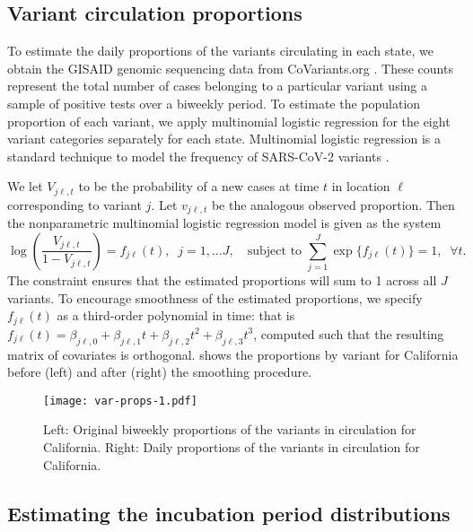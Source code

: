\subsection{Variant circulation proportions}
\label{sec:variant-proportions}


To estimate the daily proportions of the variants circulating in each state, we
obtain the GISAID genomic sequencing data from CoVariants.org
\citep{hodcroft2021covariants, elbe2017data}. These counts represent the total
number of cases belonging to a particular variant using
a sample of positive tests over a biweekly period. To estimate the population
proportion of each variant, we apply multinomial logistic regression 
for the eight variant categories separately for each state. 
Multinomial logistic regression is a standard technique to model the
frequency of SARS-CoV-2 variants 
\citep{obermeyer2022analysis, annavajhala2021emergence, figgins2021sars}.

We let $V_{j\ell,t}$ to be the probability of a new cases at time $t$ in location
$\ell$ corresponding to variant $j$. Let $v_{j\ell,t}$ be the analogous observed
proportion. Then the nonparametric multinomial logistic regression model is given
as the system
\begin{equation}
\log\left(\frac{V_{j\ell,t}}{1-V_{j\ell,t}}\right) = f_{j\ell}(t),\;\; j=1,\ldots J,\quad
\textrm{subject to }\sum_{j=1}^J \exp\{f_{j\ell}(t)\} = 1, \;\;\forall t.
\end{equation}
The constraint ensures that the estimated proportions will sum to 1 across all
$J$ variants. To encourage smoothness of the estimated proportions, we specify
$f_{j\ell}(t)$ as a third-order polynomial in time: that is $f_{j\ell}(t) =
\beta_{j\ell,0} + \beta_{j\ell,1} t + \beta_{j\ell,2}t^2 + \beta_{j\ell,3}t^3$,
computed such that the resulting matrix of covariates is orthogonal.
  shows the proportions by variant for California before
(left) and after (right) the smoothing procedure. 

\begin{figure}[!tb]
    \centering
        \texttt{[image: var-props-1.pdf]}
        \caption{Left: Original biweekly proportions of the variants in circulation
        for California. Right: Daily proportions of the variants in circulation for
        California.}
        \label{fig:prop_figs}
    \end{figure}


\subsection{Estimating the incubation period distributions} 
\label{sec:incubation}

